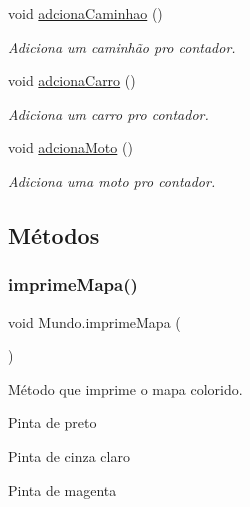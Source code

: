 \begin{DoxyCompactItemize}
\mbox{\label{class_mundo_a99e8d3c4c8eb354b5df7a8d3ea6a5f26}} 
void \mbox{\hyperlink{class_mundo_a99e8d3c4c8eb354b5df7a8d3ea6a5f26}{adciona\+Caminhao}} ()
\begin{DoxyCompactList}\small\item\em Adiciona um caminhão pro contador. \end{DoxyCompactList}\item 
\mbox{\label{class_mundo_a9db53933148e177aa218415969de95fc}} 
void \mbox{\hyperlink{class_mundo_a9db53933148e177aa218415969de95fc}{adciona\+Carro}} ()
\begin{DoxyCompactList}\small\item\em Adiciona um carro pro contador. \end{DoxyCompactList}\item 
\mbox{\label{class_mundo_a4176d036c7c8c337938c8e41f4048a32}} 
void \mbox{\hyperlink{class_mundo_a4176d036c7c8c337938c8e41f4048a32}{adciona\+Moto}} ()
\begin{DoxyCompactList}\small\item\em Adiciona uma moto pro contador. \end{DoxyCompactList}\end{DoxyCompactItemize}


\subsection{Métodos}
\mbox{\label{class_mundo_a1df37efee05155963d963b7f3ca07508}} 
\subsubsection{\texorpdfstring{imprime\+Mapa()}{imprimeMapa()}}
{\footnotesize\ttfamily void Mundo.\+imprime\+Mapa (\begin{DoxyParamCaption}{ }\end{DoxyParamCaption})}



Método que imprime o mapa colorido. 

Pinta de preto

Pinta de cinza claro

Pinta de magenta

